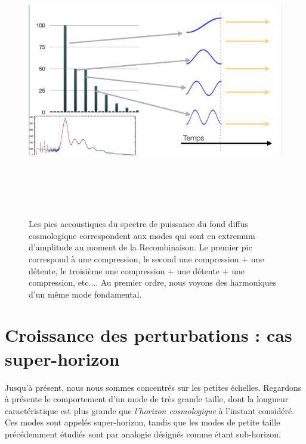 \begin{figure}[htbp]
	\centering
		\includegraphics[height=12cm]{figs/bao2.png}
	\caption[Les pics accoustiques sont des extrema]{Les pics accoustiques du spectre de puissance du fond diffus cosmologique correspondent aux modes qui sont en extremum d'amplitude au moment de la Recombinaison. Le premier pic correspond à une compression, le second une compression + une détente, le troisième une compression + une détente + une compression, etc.... Au premier ordre, nous voyons des harmoniques d'un même mode fondamental. }
	\label{f:bao2}
\end{figure}

\section{Croissance des perturbations : cas super-horizon}

Jusqu'à présent, nous nous sommes concentrés sur les petites échelles. Regardons à présente le comportement d'un mode de très grande taille, dont la longueur caractéristique est plus grande que \textit{l'horizon cosmologique} à l'instant considéré. Ces modes sont appelés super-horizon, tandis que les modes de petite taille précédemment étudiés sont par analogie désignés comme étant sub-horizon.

